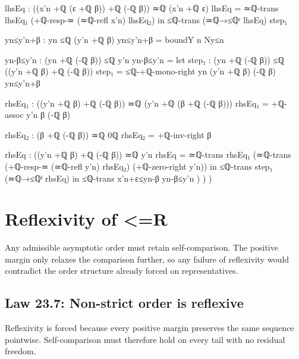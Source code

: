 \documentclass[11pt,a4paper]{book}
\def\mathbb#1{#1}%
\def\texorpdfstring#1#2{#2}%
\begin{document}
\begin{code}
{                    lhsEq : ((x'n +ℚ (ε +ℚ β)) +ℚ (-ℚ β)) ≃ℚ (x'n +ℚ ε)
                    lhsEq = ≃ℚ-trans lhsEq₁ (+ℚ-resp-≃ (≃ℚ-refl x'n) lhsEq₂)
                  in
                  ≤ℚ-trans (≃ℚ→≤ℚʳ lhsEq) step₁

                yn≤y'n+β : yn ≤ℚ (y'n +ℚ β)
                yn≤y'n+β = boundY n Ny≤n

                yn-β≤y'n : (yn +ℚ (-ℚ β)) ≤ℚ y'n
                yn-β≤y'n =
                  let
                    step₁ : (yn +ℚ (-ℚ β)) ≤ℚ ((y'n +ℚ β) +ℚ (-ℚ β))
                    step₁ = ≤ℚ-+ℚ-mono-right yn (y'n +ℚ β) (-ℚ β) yn≤y'n+β

                    rhsEq₁ : ((y'n +ℚ β) +ℚ (-ℚ β)) ≃ℚ (y'n +ℚ (β +ℚ (-ℚ β)))
                    rhsEq₁ = +ℚ-assoc y'n β (-ℚ β)

                    rhsEq₂ : (β +ℚ (-ℚ β)) ≃ℚ 0ℚ
                    rhsEq₂ = +ℚ-inv-right β

                    rhsEq : ((y'n +ℚ β) +ℚ (-ℚ β)) ≃ℚ y'n
                    rhsEq =
                      ≃ℚ-trans
                        rhsEq₁
                        (≃ℚ-trans
                          (+ℚ-resp-≃ (≃ℚ-refl y'n) rhsEq₂)
                          (+ℚ-zero-right y'n))
                  in
                  ≤ℚ-trans step₁ (≃ℚ→≤ℚˡ rhsEq)
              in
              ≤ℚ-trans x'n+ε≤yn-β yn-β≤y'n
            )
          )
        )
    }
\end{code}


\section{Reflexivity of \texorpdfstring{$\le_{\mathbb{R}}$}{<=R}}

Any admissible asymptotic order must retain self-comparison. The positive margin only relaxes the comparison further, so any failure of reflexivity would contradict the order structure already forced on representatives.

\subsection*{Law 23.7: Non-strict order is reflexive}

Reflexivity is forced because every positive margin preserves the same sequence pointwise. Self-comparison must therefore hold on every tail with no residual freedom.
\end{document}
